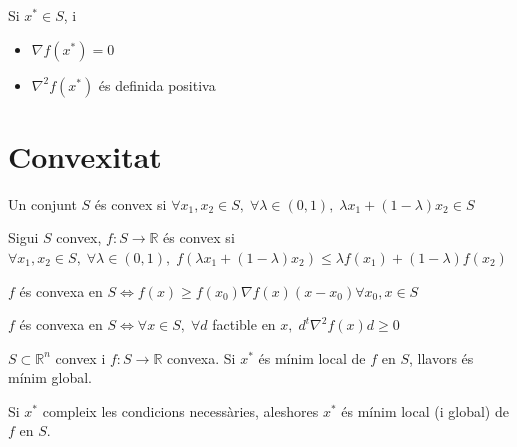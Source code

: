 \documentclass[../main.tex]{subfiles}
\begin{document}
\begin{teorema}
	Si $x^* \in S$, i
	\begin{itemize}
		\item $\nabla f(x^*) = 0$
		\item $\nabla^2 f(x^*)$ és definida positiva
	\end{itemize}
\end{teorema}

\chapter{Convexitat}
\begin{definicio}
	Un conjunt $S$ és convex si $\forall x_1, x_2 \in S,\;\forall \lambda \in (0, 1),\;\lambda x_1 + (1-\lambda)x_2 \in S$
\end{definicio}
\begin{definicio}
	Sigui $S$ convex, $f: S \to \mathbb{R}$ és convex si $\forall x_1, x_2 \in S,\;\forall\lambda\in(0,1),\;f(\lambda x_1+(1-\lambda)x_2) \leq \lambda f(x_1)+(1-\lambda)f(x_2)$
\end{definicio}
\begin{proposicio}
$f$ és convexa en $S \iff f(x) \geq f(x_0)\nabla f(x)(x-x_0)\forall x_0,x \in S$
\end{proposicio}
\begin{proposicio}
$f$ és convexa en $S \iff \forall x \in S,\;\forall d$ factible en $x,\;d^t\nabla^2 f(x)d \geq 0$
\end{proposicio}
\begin{teorema}
$S\subset \mathbb{R}^n$ convex i $f : S \to \mathbb{R}$ convexa. Si $x^*$ és mínim local de $f$ en $S$, llavors és mínim global.
\end{teorema}
\begin{teorema}
Si $x^*$ compleix les condicions necessàries, aleshores $x^*$ és mínim local (i global) de $f$ en $S$.
\end{teorema}
\end{document}
